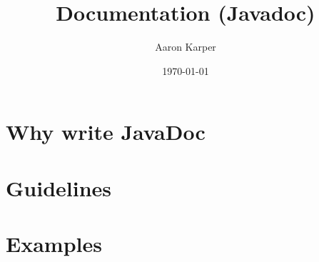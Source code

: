 \documentclass{beamer}
\author{Aaron Karper}
\title{Documentation (Javadoc)}
\date{\today}
\begin{document}
\frame{\titlepage}
\section{Why write JavaDoc}
\frame{\frametitle{}

}
\section{Guidelines}

\section{Examples}
\end{document}
